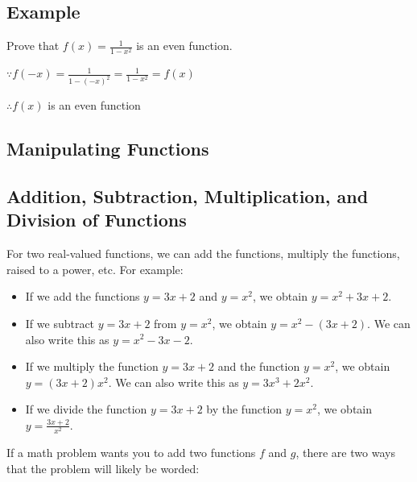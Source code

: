 \subsection{Example}
\label{sss:exam-1a79}

Prove that $f(x) = \frac{1}{1 - x^2}$ is an even function.

$\because f(-x) = \frac{1}{1 - (-x)^2} = \frac{1}{1 - x^2} = f(x)$

$\therefore f(x)$ is an even function

\subsection{Manipulating Functions}
\label{sss:mani-12b7}

\subsection{Addition, Subtraction, Multiplication, and Division of Functions}
\label{sss:addi-f096}

For two real-valued functions, we can add the functions, multiply the functions, raised to
a power, etc. For example:

\begin{itemize}
    \item If we add the functions $y = 3x + 2$ and $y = x^2$, we obtain $y = x^2 + 3x + 2$.
    \item If we subtract $y = 3x + 2$ from $y = x^2$, we obtain $y = x^2 - (3x + 2)$. We can also write this as $y = x^2 - 3x - 2$.
    \item If we multiply the function $y = 3x + 2$ and the function $y = x^2$, we obtain $y = (3x + 2)x^2$. We can also write this as $y = 3x^3 + 2x^2$.
    \item If we divide the function $y = 3x + 2$ by the function $y = x^2$, we obtain $y = \frac{3x + 2}{x^2}$.
\end{itemize}

If a math problem wants you to add two functions $f$ and $g$, there are two ways that the problem will likely be worded:

